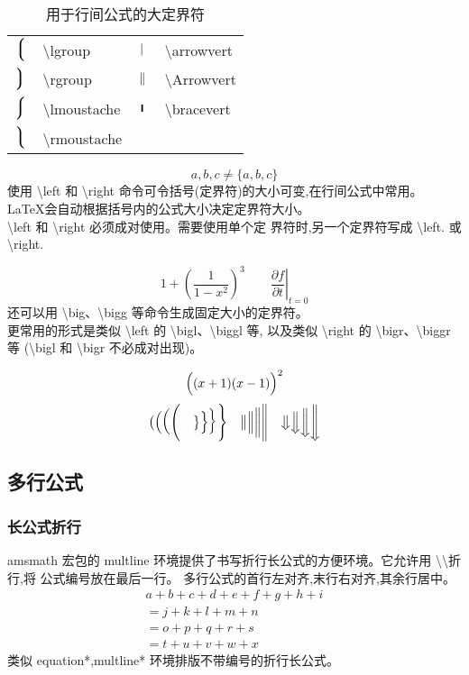 \documentclass[a4paper]{ctexart}
\begin{document}
    \begin{table}[H]
        \centering
        \caption{用于行间公式的大定界符}
        \begin{tabular}{clcl}
            \toprule
            $\left\lgroup\right.$           & \textbackslash lgroup         & 
            $\left\arrowvert\right.$        & \textbackslash arrowvert      \\
            $\left\rgroup\right.$           & \textbackslash rgroup         &
            $\left\Arrowvert\right.$        & \textbackslash Arrowvert      \\ 
            $\left\lmoustache\right.$       & \textbackslash lmoustache     &
            $\left\bracevert\right.$        & \textbackslash bracevert      \\
            $\left\rmoustache\right.$       & \textbackslash rmoustache     \\
            \bottomrule
        \end{tabular}
    \end{table}
    \[ {a,b,c} \neq \{a,b,c\} \]
    使用 \textbackslash left 和 \textbackslash right 命令可令括号(定界符)的大小可变,在行间公式中常用。%
    \LaTeX 会自动根据括号内的公式大小决定定界符大小。\\
    \textbackslash left 和 \textbackslash right 必须成对使用。需要使用单个定 界符时,另一个定界符写成%
    \textbackslash left. 或 \textbackslash right.\par
    \[
        1 + \left( \frac{1}{1 - x^2} \right)^3  \qquad
        \left.\frac{\partial f}{\partial t} \right|_{t = 0} 
    \]
    还可以用 \textbackslash big、\textbackslash bigg 等命令生成固定大小的定界符。\\
    更常用的形式是类似 \textbackslash left 的 \textbackslash bigl、\textbackslash biggl 等,%
    以及类似 \textbackslash right 的 \textbackslash bigr、\textbackslash biggr 等%
    (\textbackslash bigl 和 \textbackslash bigr 不必成对出现)。\par
    \[ \Bigl((x + 1)(x - 1)\Bigr)^2 \]
    \[  \bigl( \Bigl( \biggl( \Biggl( \quad 
        \bigr\} \Bigr\} \biggr\} \Biggr\} \quad
        \big\| \Big\| \bigg\| \Bigg\| \quad
        \big\Downarrow \Big\Downarrow
        \bigg\Downarrow \Bigg\Downarrow
    \]
    \subsection{多行公式}
    \subsubsection{长公式折行}
    amsmath 宏包的 multline 环境提供了书写折行长公式的方便环境。它允许用 %
    \textbackslash\textbackslash 折行,将 公式编号放在最后一行。%
    多行公式的首行左对齐,末行右对齐,其余行居中。
    \begin{multline}
        a + b + c + d + e + f + g + h + i\\
        = j + k + l + m + n\\
        = o + p + q + r + s\\
        = t + u + v + w + x
    \end{multline}
    类似 equation*,multline* 环境排版不带编号的折行长公式。
\end{document}

